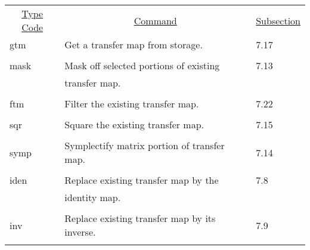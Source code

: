 \begin{center}
\begin{tabular}{lll}
\multicolumn{1}{c}{\underline{Type Code}} &
\multicolumn{1}{c}{\underline{Command}}   &
\multicolumn{1}{c}{\underline{Subsection}} \\
\hspace{1.5em}gtm   &        Get a transfer map from storage.      & \hspace{2em}7.17\\
\vspace{-3mm}& &\\
\hspace{1.5em}mask  &      Mask off selected portions of existing & \hspace{2em}7.13\\
                    & transfer map.                                &\\
\vspace{-3mm}& &\\
\hspace{1.5em}ftm   &        Filter the existing transfer map.     & \hspace{2em}7.22\\
\vspace{-3mm}& &\\
\hspace{1.5em}sqr   &        Square the existing transfer map.     & \hspace{2em}7.15\\
\vspace{-3mm}& &\\
\hspace{1.5em}symp  & Symplectify matrix portion of transfer map. & \hspace{2em}7.14\\
\vspace{-3mm}& &\\
\hspace{1.5em}iden  &         Replace existing transfer map by the & \hspace{2em}7.8\\
                    & identity map.                                &\\
\vspace{-3mm}& &\\
\hspace{1.5em}inv   & Replace existing transfer map by its inverse. & \hspace{2em}7.9\\
\vspace{-3mm}& &\\

\end{tabular}
\end{center}
